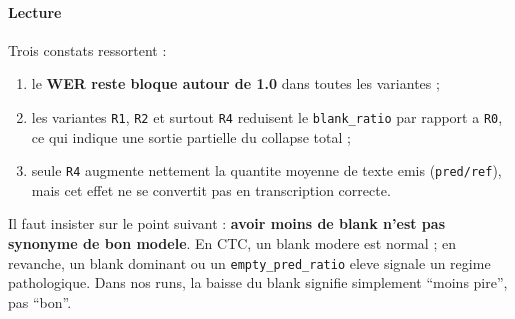 \documentclass[11pt,a4paper]{article}
\begin{document}
\begin{table}[H]
\centering
\caption{Resultats LibriSpeech, meilleur checkpoint, seeds 42/123/456/789/1024}
\label{tab:librispeech-results}
\end{table}

\paragraph{Lecture}
Trois constats ressortent :
\begin{enumerate}[leftmargin=1.2cm]
\item le \textbf{WER reste bloque autour de 1.0} dans toutes les variantes ;
\item les variantes \texttt{R1}, \texttt{R2} et surtout \texttt{R4} reduisent le \texttt{blank\_ratio} par rapport a \texttt{R0}, ce qui indique une sortie partielle du collapse total ;
\item seule \texttt{R4} augmente nettement la quantite moyenne de texte emis (\texttt{pred/ref}), mais cet effet ne se convertit pas en transcription correcte.
\end{enumerate}

Il faut insister sur le point suivant : \textbf{avoir moins de blank n'est pas synonyme de bon modele}. En CTC, un blank modere est normal ; en revanche, un blank dominant ou un \texttt{empty\_pred\_ratio} eleve signale un regime pathologique. Dans nos runs, la baisse du blank signifie simplement ``moins pire'', pas ``bon''.
\end{document}
